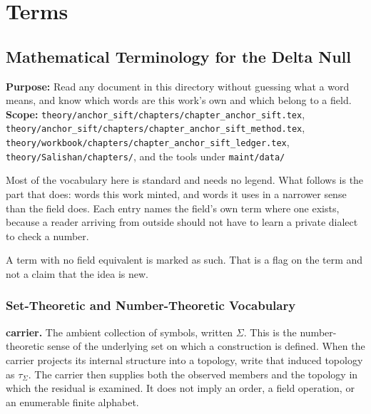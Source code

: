 \chapter{Terms}

\section{Mathematical Terminology for the Delta Null}

\textbf{Purpose:} Read any document in this directory without guessing what a word means, and know which words are this work's own and which belong to a field. \textbf{Scope:} \texttt{theory/\allowbreak{}anchor\_\allowbreak{}sift/\allowbreak{}chapters/\allowbreak{}chapter\_\allowbreak{}anchor\_\allowbreak{}sift.\allowbreak{}tex}, \texttt{theory/\allowbreak{}anchor\_\allowbreak{}sift/\allowbreak{}chapters/\allowbreak{}chapter\_\allowbreak{}anchor\_\allowbreak{}sift\_\allowbreak{}method.\allowbreak{}tex}, \texttt{theory/\allowbreak{}workbook/\allowbreak{}chapters/\allowbreak{}chapter\_\allowbreak{}anchor\_\allowbreak{}sift\_\allowbreak{}ledger.\allowbreak{}tex}, \texttt{theory/\allowbreak{}Salishan/\allowbreak{}chapters/\allowbreak{}}, and the tools under \texttt{maint/\allowbreak{}data/\allowbreak{}}

Most of the vocabulary here is standard and needs no legend. What follows is the part that does: words this work minted, and words it uses in a narrower sense than the field does. Each entry names the field's own term where one exists, because a reader arriving from outside should not have to learn a private dialect to check a number.

A term with no field equivalent is marked as such. That is a flag on the term and not a claim that the idea is new.

\subsection{Set-Theoretic and Number-Theoretic Vocabulary}

\textbf{carrier.} The ambient collection of symbols, written \(\Sigma\). This is the number-theoretic sense of the underlying set on which a construction is defined. When the carrier projects its internal structure into a topology, write that induced topology as \(\tau_\Sigma\). The carrier then supplies both the observed members and the topology in which the residual is examined. It does not imply an order, a field operation, or an enumerable finite alphabet.

